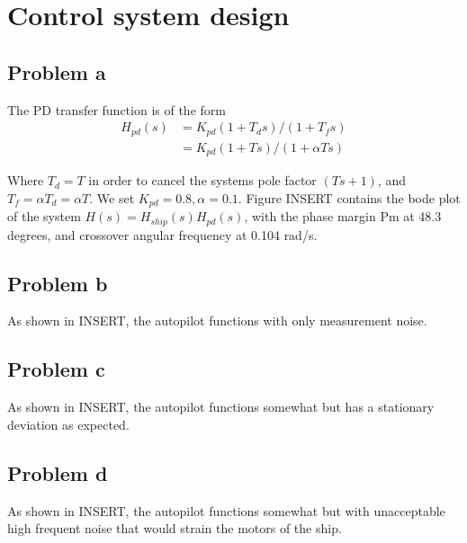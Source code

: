 \section{Control system design}

\subsection{Problem a}

The PD transfer function is of the form
\begin{align*}
    H_{pd}(s) &= K_{pd}(1+T_d s)/(1+T_f s) \\
              &= K_{pd}(1+T s)/(1+\alpha T s)
\end{align*}

Where $T_d = T$ in order to cancel the systems pole factor $(Ts + 1)$, and $T_f = \alpha T_d = \alpha T$. We set $K_{pd} = 0.8, \alpha = 0.1$. Figure INSERT contains the bode plot of the system $H(s) = H_{ship}(s)H_{pd}(s)$, with the phase margin Pm at 48.3 degrees, and crossover angular frequency at 0.104 rad/s.

\subsection{Problem b}
As shown in INSERT, the autopilot functions with only measurement noise.

\subsection{Problem c}
As shown in INSERT, the autopilot functions somewhat but has a stationary deviation as expected.

\subsection{Problem d}
As shown in INSERT, the autopilot functions somewhat but with unacceptable high frequent noise that would strain the motors of the ship.